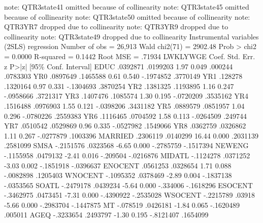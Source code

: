note: QTR3state41 omitted because of collinearity
note: QTR3state45 omitted because of collinearity
note: QTR3state50 omitted because of collinearity
note: QTR3YR7 dropped due to collinearity
note: QTR3YR9 dropped due to collinearity
note: QTR3state49 dropped due to collinearity
{\smallskip}
Instrumental variables (2SLS) regression          Number of obs   =     26,913
                                                  Wald chi2(71)   =    2902.48
                                                  Prob > chi2     =     0.0000
                                                  R-squared       =     0.1442
                                                  Root MSE        =     .71934
{\smallskip}
    LWKLYWGE {\VBAR}      Coef.   Std. Err.      z    P>|z|     [95\% Conf. Interval]
        EDUC {\VBAR}   .0392871   .0199203     1.97   0.049      .000244    .0783303
         YR0 {\VBAR}   .0897649   .1465588     0.61   0.540    -.1974852    .3770149
         YR1 {\VBAR}    .128278   .1320164     0.97   0.331    -.1304693    .3870254
         YR2 {\VBAR}   .1381325   .1193895     1.16   0.247    -.0958666    .3721317
         YR3 {\VBAR}   .1407476   .1085574     1.30   0.195    -.0720209    .3535162
         YR4 {\VBAR}   .1516488   .0976903     1.55   0.121    -.0398206    .3431182
         YR5 {\VBAR}   .0889579   .0851957     1.04   0.296    -.0780226    .2559383
         YR6 {\VBAR}   .1116465   .0704592     1.58   0.113    -.0264509     .249744
         YR7 {\VBAR}   .0510542   .0529869     0.96   0.335    -.0527982    .1549066
         YR8 {\VBAR}   .0362759   .0326862     1.11   0.267    -.0277879    .1003396
     MARRIED {\VBAR}   .2306119   .0140299    16.44   0.000     .2031139    .2581099
        SMSA {\VBAR}  -.2151576   .0323568    -6.65   0.000    -.2785759   -.1517394
      NEWENG {\VBAR}  -.1155958   .0479132    -2.41   0.016     -.209504   -.0216876
      MIDATL {\VBAR}  -.1124278   .0371252    -3.03   0.002    -.1851918   -.0396637
     ENOCENT {\VBAR}   .0561253   .0328654     1.71   0.088    -.0082898    .1205403
     WNOCENT {\VBAR}  -.1095352   .0378469    -2.89   0.004    -.1837138   -.0353565
       SOATL {\VBAR}  -.2479178   .0439234    -5.64   0.000     -.334006   -.1618296
     ESOCENT {\VBAR}  -.3462975   .0473451    -7.31   0.000    -.4390922   -.2535028
     WSOCENT {\VBAR}  -.2215789     .03918    -5.66   0.000    -.2983704   -.1447875
          MT {\VBAR}   -.078519   .0426181    -1.84   0.065    -.1620489     .005011
        AGEQ {\VBAR}  -.3233654   .2493797    -1.30   0.195    -.8121407    .1654099
